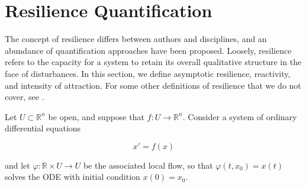\section{Resilience Quantification}
\label{sec:resilience}

The concept of resilience differs between authors and disciplines, and an abundance of quantification approaches have been proposed. Loosely, resilience refers to the capacity for a system to retain its overall qualitative structure in the face of disturbances. 
%
In this section, we define asymptotic resilience, reactivity, and intensity of attraction. 
%
For some other definitions of resilience that we do not cover, see \cite{meyerMathematicalReviewResilience2016}.



Let $U \subset \mathbb{R}^n$ be open, and suppose that $f : U \to \mathbb{R}^n$. Consider a system of ordinary differential equations 

\begin{equation}
	\label{eqn:ode}
	x' = f(x)
\end{equation}

and let $\varphi: \mathbb{R} \times U \to U$ be the associated local flow, so that $\varphi(t,x_0) = x(t)$ solves the ODE with initial condition $x(0) = x_0$.






